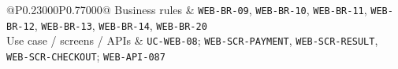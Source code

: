 \begin{longtable}{@{}P{0.23000\SRSWidth}P{0.77000\SRSWidth}@{}}
Business rules & \texttt{WEB-\allowbreak{}BR-\allowbreak{}09}, \texttt{WEB-\allowbreak{}BR-\allowbreak{}10}, \texttt{WEB-\allowbreak{}BR-\allowbreak{}11}, \texttt{WEB-\allowbreak{}BR-\allowbreak{}12}, \texttt{WEB-\allowbreak{}BR-\allowbreak{}13}, \texttt{WEB-\allowbreak{}BR-\allowbreak{}14}, \texttt{WEB-\allowbreak{}BR-\allowbreak{}20} \\[3pt]
Use case /\allowbreak{} screens /\allowbreak{} APIs & \texttt{UC-\allowbreak{}WEB-\allowbreak{}08}; \texttt{WEB-\allowbreak{}SCR-\allowbreak{}PAYMENT}, \texttt{WEB-\allowbreak{}SCR-\allowbreak{}RESULT}, \texttt{WEB-\allowbreak{}SCR-\allowbreak{}CHECKOUT\allowbreak{}}; \texttt{WEB-\allowbreak{}API-\allowbreak{}087} \\[3pt]
\end{longtable}
\endgroup

